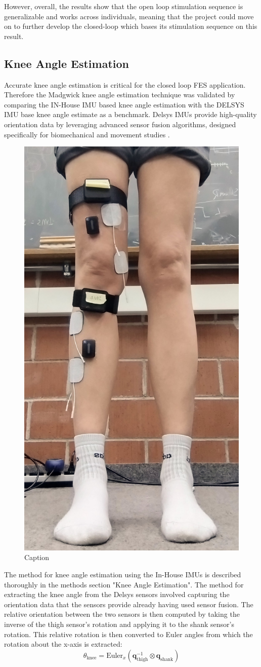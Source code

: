 However, overall, the results show that the open loop stimulation sequence is generalizable and works across individuals, meaning that the project could move on to further develop the closed-loop which bases its stimulation sequence on this result.


\subsection{Knee Angle Estimation}
Accurate knee angle estimation is critical for the closed loop FES application. Therefore the Madgwick knee angle estimation technique was validated by comparing the IN-House IMU based knee angle estimation with the DELSYS IMU base knee angle estimate as a benchmark. Delsys IMUs provide high-quality orientation data by leveraging advanced sensor fusion algorithms, designed specifically for biomechanical and movement studies . 

\begin{figure} 
    \centering
    \includegraphics[width=0.5\linewidth]{images/delsyssetup.jpg}
    \caption{Caption}
    \label{fig:enter-label}
\end{figure}

The method for knee angle estimation using the In-House IMUs is described thoroughly in the methods section "Knee Angle Estimation". The method for extracting the knee angle from the Delsys sensors involved capturing the orientation data that the sensors provide already having used sensor fusion. The relative orientation between the two sensors is then computed by taking the inverse of the thigh sensor's rotation and applying it to the shank sensor's rotation. This relative rotation is then converted to Euler angles from which the rotation about the x-axis is extracted:
\begin{equation}
    \theta_{\text{knee}} = \text{Euler}_x \left( \mathbf{q}_{\text{thigh}}^{-1} \otimes \mathbf{q}_{\text{shank}} \right)
\end{equation}


